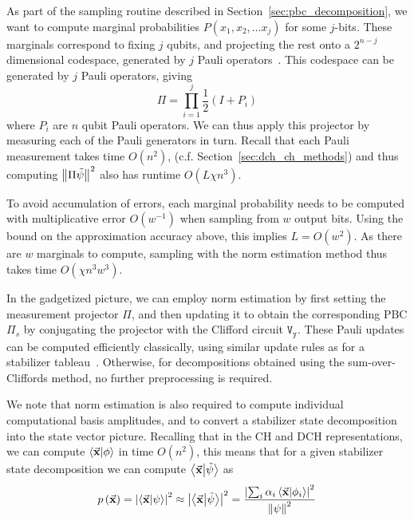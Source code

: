 As part of the sampling routine described in Section~\ref{sec:pbc_decomposition}, we want to compute marginal probabilities $P\left(x_{1},x_{2},\dots x_{j}\right)$ for some $j$-bits. These marginals correspond to fixing $j$ qubits, and projecting the rest onto a $2^{n-j}$ dimensional codespace, generated by $j$ Pauli operators~\cite{Bravyi2016}. This codespace can be generated by $j$ Pauli operators, giving
\[\Pi = \prod_{i=1}^{j}\frac{1}{2}\left(I+P_{i}\right)\]
where $P_{i}$ are $n$ qubit Pauli operators. We can thus apply this projector by measuring each of the Pauli generators in turn. Recall that each Pauli measurement takes time $O(n^{2})$, (c.f. Section~\ref{sec:dch_ch_methods}) and thus computing $\norm{\Pi\tilde{\psi}}^{2}$ also has runtime $O\left(L\chi n^{3}\right)$.\par
To avoid accumulation of errors, each marginal probability needs to be computed with multiplicative error $O(w^{-1})$ when sampling from $w$ output bits. Using the bound on the approximation accuracy above, this implies $L=O(w^{2})$. As there are $w$ marginals to compute, sampling with the norm estimation method thus takes time $O(\chi n^{3}w^{3})$.\par
In the gadgetized picture, we can employ norm estimation by first setting the measurement projector $\Pi$, and then updating it to obtain the corresponding PBC $\Pi_{s}$ by conjugating the projector with the Clifford circuit $\mathtt{V_{y}}$. These Pauli updates can be computed efficiently classically, using similar update rules as for a stabilizer tableau~\cite{Aaronson2004}. Otherwise, for decompositions obtained using the sum-over-Cliffords method, no further preprocessing is required.\par
We note that norm estimation is also required to compute individual computational basis amplitudes, and to convert a stabilizer state decomposition into the state vector picture. Recalling that in the CH and DCH representations, we can compute $\braket{\va{x}}{\phi}$ in time $O(n^{2})$, this means that for a given stabilizer state decomposition we can compute $\braket{\va{x}}{\tilde{\psi}}$ as
\begin{equation}
    p\left(\va{x}\right) = \left|\braket{\va{x}}{\psi}\right|^{2}\approx \left|\braket{\va{x}}{\tilde{\psi}}\right|^{2} = \frac{\left|\sum_{i}\alpha_{i}\braket{\va{x}}{\phi_{i}}\right|^{2}}{\norm{\psi}^{2}}\label{eq:decomp_amplitude}
\end{equation}

